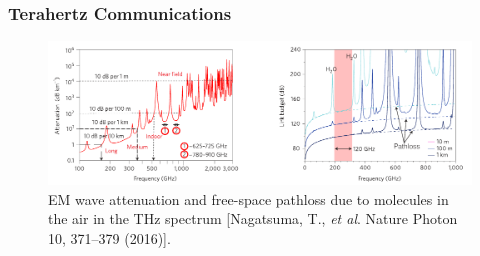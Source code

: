 \documentclass[10pt]{beamer}
\begin{document}
\begin{frame}
    \frametitle{Terahertz Communications}

    \begin{figure}[h!]
        \centering
        \includegraphics[width=.95\textwidth]{THz Attenuation.pdf}
        \caption{EM wave attenuation and free-space pathloss due to  molecules in the air in the THz spectrum \tiny{[Nagatsuma, T., \textit{et al}. Nature Photon 10, 371–379 (2016)]}.}
    \end{figure}
\end{frame}
\end{document}
